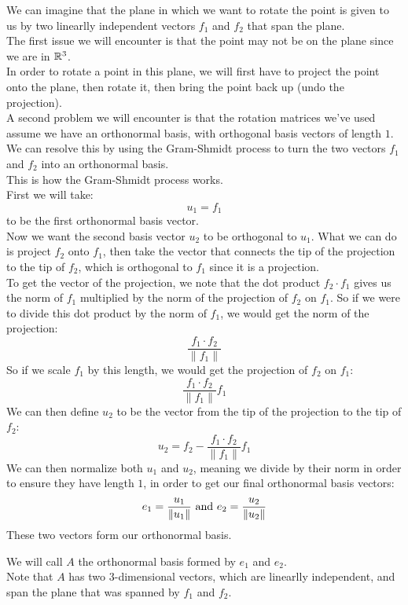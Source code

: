 \documentclass[12pt]{article}
\begin{document}
We can imagine that the plane in which we
want to rotate the point is given to
us by two linearlly independent vectors
$f_1$ and $f_2$ that span the plane. \\

The first issue we will encounter is that
the point may not be on the plane
since we are in $\mathbb{R}^3$. \\
In order to rotate a point in this plane,
we will first have to project the point
onto the plane,
then rotate it, then bring the point back up
(undo the projection). \\

A second problem we will encounter is
that the rotation matrices we've used
assume we have an orthonormal basis,
with orthogonal basis vectors of length $1$. \\
We can resolve this by using
the Gram-Shmidt process to turn the
two vectors $f_1$ and $f_2$ into an orthonormal
basis. \\

This is how the Gram-Shmidt process works. \\
First we will take:
\[ u_1 = f_1 \]
to be the first orthonormal basis vector. \\
Now we want the second basis vector $u_2$ to
be orthogonal to $u_1$.
What we can do is project $f_2$ onto $f_1$,
then take the vector that connects
the tip of the projection to the tip of $f_2$,
which is orthogonal to $f_1$
since it is a projection. \\
To get the vector of the projection,
we note that the dot product $f_2 \cdot f_1$
gives us the norm of $f_1$
multiplied by the norm of the projection
of $f_2$ on $f_1$.
So if we were to divide this dot product
by the norm of $f_1$, we would
get the norm of the projection:
\[ \dfrac{f_1 \cdot f_2}{\|f_1\|} \]
So if we scale $f_1$ by this length,
we would get the projection
of $f_2$ on $f_1$:
\[ \dfrac{f_1 \cdot f_2}{\|f_1\|}f_1 \]
We can then define $u_2$
to be the vector from the tip of the projection
to the tip of $f_2$:
\[ u_2 = f_2 - \dfrac{f_1 \cdot f_2}{\|f_1\|}f_1 \]
We can then normalize both $u_1$ and $u_2$,
meaning we divide by their
norm in order to ensure they have length $1$,
in order to get our final orthonormal basis vectors:
\[ e_1 = \dfrac{u_1}{\|u_1\|} \text{ and }
e_2 = \dfrac{u_2}{\|u_2\|} \]
These two vectors form our orthonormal basis. 

We will call $A$ the orthonormal basis formed by
$e_1$ and $e_2$. \\
Note that $A$ has two $3$-dimensional vectors,
which are linearlly independent,
and span the plane that was spanned
by $f_1$ and $f_2$. \\
\end{document}
